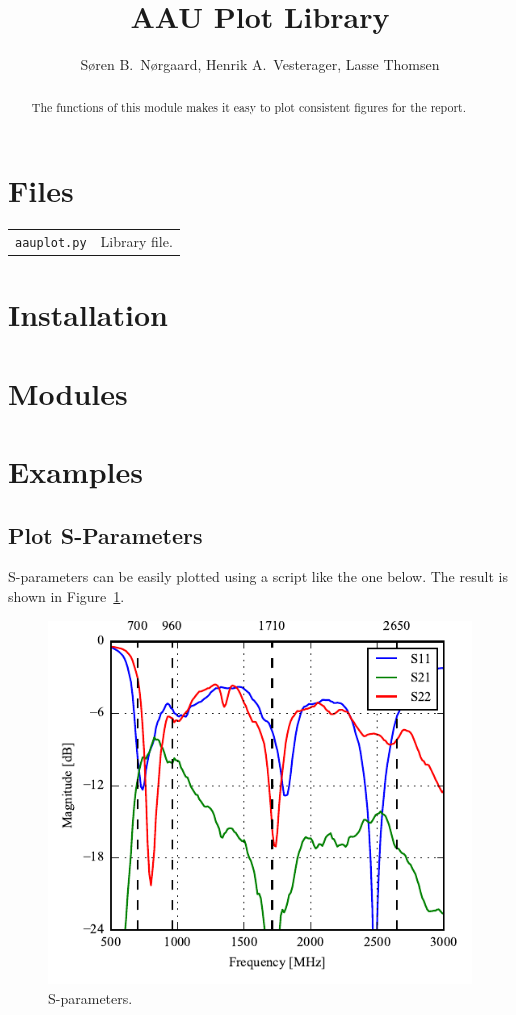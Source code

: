 \documentclass[10pt]{article}
\title{AAU Plot Library}
\author{Søren B.\ Nørgaard, Henrik A.\ Vesterager, Lasse Thomsen}
\begin{document}
\maketitle

\begin{abstract}
    The functions of this module makes it easy to plot consistent figures for the report.
\end{abstract}

\tableofcontents


\section{Files}
\begin{tabularx}{\linewidth}{lX}
    \texttt{aauplot.py} & Library file. \\
\end{tabularx}

\section{Installation}


\section{Modules}


\clearpage
\section{Examples}

\subsection{Plot S-Parameters}

S-parameters can be easily plotted using a script like the one below. The result is shown in Figure~\ref{fig:example1}.

\begin{figure}[htbp]
    \centering
    \includegraphics{examples/ex1_sparams.pdf}
    \caption{S-parameters.}
    \label{fig:example1}
\end{figure}
\end{document}
